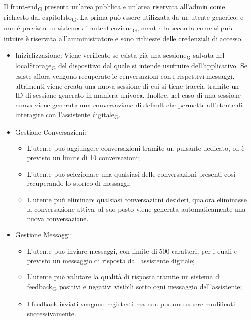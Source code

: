 Il front-end\textsubscript{G} presenta un’area pubblica e un’area riservata all’admin come richiesto dal capitolato\textsubscript{G}. La prima può essere utilizzata da un utente generico, e non è previsto un sistema di autenticazione\textsubscript{G}, mentre la seconda come si può intuire è riservata all’amministratore e sono richieste delle credenziali di accesso.
\begin{itemize}
    \item Inizializzazione: 
    \newline \newline Viene verificato se esista già una sessione\textsubscript{G} salvata nel localStorage\textsubscript{G} del dispositivo dal quale si intende usufruire dell’applicativo. Se esiste allora vengono recuperate le conversazioni con i rispettivi messaggi, altrimenti viene creata una nuova sessione di cui si tiene traccia tramite un ID di sessione generato in maniera univoca. Inoltre, nel caso di una sessione nuova viene generata una conversazione di default che permette all'utente di interagire con l'assistente digitale\textsubscript{G}. 
    \item Gestione Conversazioni:
    \begin{itemize}
        \item L'utente può aggiungere conversazioni tramite un pulsante dedicato, ed è previsto un limite di 10 conversazioni; 
        \item L'utente può selezionare una qualsiasi delle conversazioni presenti così recuperando lo storico di messaggi;
        \item L'utente puù eliminare qualsiasi conversazioni desideri, qualora eliminasse la conversazione attiva, al suo posto viene generata automaticamente una nuova conversazione. 
    \end{itemize}
     \item Gestione Messaggi:
     \begin{itemize}
         \item L'utente può inviare messaggi, con limite di 500 caratteri, per i quali è previsto un messaggio di risposta dall'assistente digitale;
         \item L'utente può valutare la qualità di risposta tramite un sistema di feedback\textsubscript{G} positivi e negativi visibili sotto ogni messaggio dell’assistente;
         \item I feedback inviati vengono registrati ma non possono essere modificati successivamente.
     \end{itemize}
\end{itemize}

